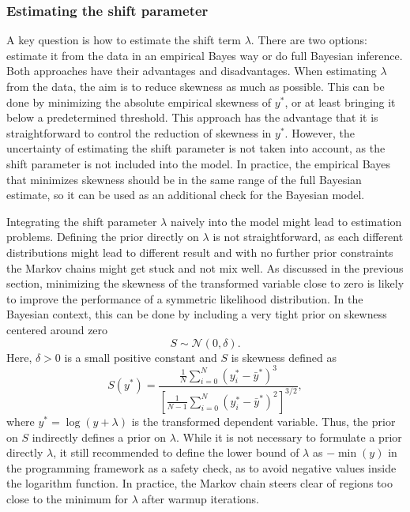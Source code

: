 \subsubsection{Estimating the shift parameter}
A key question is how to estimate the shift term $\lambda$.
There are two options: estimate it from the data in an empirical Bayes way or do full Bayesian inference.
Both approaches have their advantages and disadvantages.
When estimating $\lambda$ from the data, the aim is to reduce skewness as much as possible.
This can be done by minimizing the absolute empirical skewness of $y^*$, or at least bringing it below a predetermined threshold.
This approach has the advantage that it is straightforward to control the reduction of skewness in $y^*$.
However, the uncertainty of estimating the shift parameter is not taken into account, as the shift parameter is not included into the model.
In practice, the empirical Bayes that minimizes skewness should be in the same range of the full Bayesian estimate, so it can be used as an additional check for the Bayesian model.

Integrating the shift parameter $\lambda$ naively into the model might lead to estimation problems.
Defining the prior directly on $\lambda$ is not straightforward, as each different distributions might lead to different result and with no further prior constraints the Markov chains might get stuck and not mix well.
As discussed in the previous section, minimizing the skewness of the transformed variable close to zero is likely to improve the performance of a symmetric likelihood distribution.
In the Bayesian context, this can be done by including a very tight prior on skewness centered around zero
\begin{equation*}
    S \sim \mathcal N(0, \delta).
\end{equation*}
Here, $\delta > 0$ is a small positive constant and $S$ is skewness defined as
\begin{equation*}
    \displaystyle S(y^*) =  \frac{\frac 1 N \sum^{N}_{i = 0} (y_i^* - \bar y^* )^3}
    {\left[ \frac{1}{N - 1} \sum^{N}_{i = 0} (y_i^* - \bar y^* )^2 \right]^{3/2}},
\end{equation*}
where $y^* = \log(y + \lambda)$ is the transformed dependent variable. Thus, the prior on $S$ indirectly defines a prior on $\lambda$.
While it is not necessary to formulate a prior directly $\lambda$, it still recommended to define the lower bound of $\lambda$ as $-\min(y)$ in the programming framework as a safety check, as to avoid negative values inside the logarithm function.
In practice, the Markov chain steers clear of regions too close to the minimum for $\lambda$ after warmup iterations.



